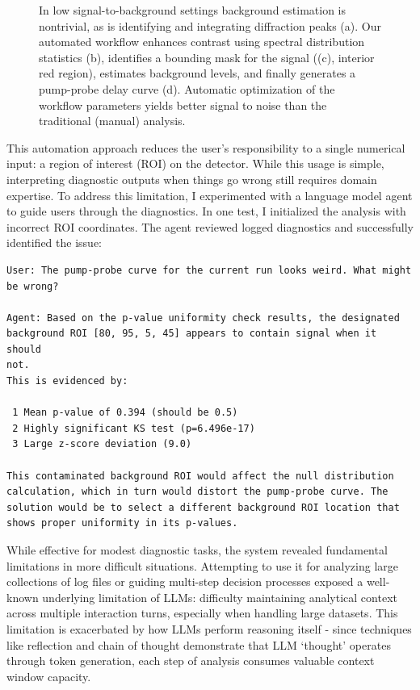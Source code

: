 \documentclass{article}
\begin{document}
\begin{figure}[htbp]
    \caption{In low signal-to-background settings background estimation is nontrivial, as is identifying and integrating diffraction peaks (a). Our automated workflow enhances contrast using spectral distribution statistics (b), identifies a bounding mask for the signal ((c), interior red region), estimates background levels, and finally generates a pump-probe delay curve (d). Automatic optimization of the workflow parameters yields better signal to noise than the traditional (manual) analysis.}\label{pipeline}
    \label{fig:analysis}
\end{figure}
This automation approach reduces the user's responsibility to a single numerical input: a region of interest (ROI) on the detector. While this usage is simple, interpreting diagnostic outputs when things go wrong still requires domain expertise. To address this limitation, I experimented with a language model agent to guide users through the diagnostics. In one test, I initialized the analysis with incorrect ROI coordinates. The agent reviewed logged diagnostics and successfully identified the issue:

    \vspace{0.3cm}
    \begin{Verbatim}[fontsize=\small,frame=single]
User: The pump-probe curve for the current run looks weird. What might
be wrong?

Agent: Based on the p-value uniformity check results, the designated 
background ROI [80, 95, 5, 45] appears to contain signal when it should 
not.                                                                    
This is evidenced by:

 1 Mean p-value of 0.394 (should be 0.5)
 2 Highly significant KS test (p=6.496e-17)
 3 Large z-score deviation (9.0)

This contaminated background ROI would affect the null distribution     
calculation, which in turn would distort the pump-probe curve. The      
solution would be to select a different background ROI location that    
shows proper uniformity in its p-values.
    \end{Verbatim}


While effective for modest diagnostic tasks, the system revealed fundamental limitations in more difficult situations. Attempting to use it for analyzing large collections of log files or guiding multi-step decision processes exposed a well-known underlying limitation of LLMs: difficulty maintaining analytical context across multiple interaction turns, especially when handling large datasets. This limitation is exacerbated by how LLMs perform reasoning itself - since techniques like reflection and chain of thought demonstrate that LLM `thought' operates through token generation, each step of analysis consumes valuable context window capacity.
\end{document}
